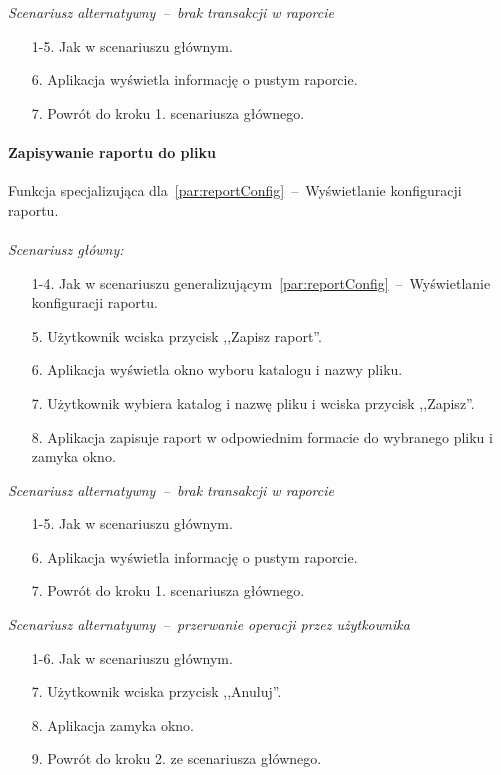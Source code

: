 \textit{Scenariusz alternatywny~--~brak transakcji w raporcie}
\begin{enumerate}
  \item[1-5.] Jak w scenariuszu głównym.
  \item[6.] Aplikacja wyświetla informację o pustym raporcie.
  \item[7.] Powrót do kroku 1. scenariusza głównego.
\end{enumerate}

\paragraph{Zapisywanie raportu do pliku\newline}
\label{par:reportExport}
\indent Funkcja specjalizująca dla~\ref{par:reportConfig}~--~Wyświetlanie konfiguracji raportu.\\\\
\textit{Scenariusz główny:}
\begin{enumerate}
  \item[1-4.] Jak w scenariuszu generalizującym~\ref{par:reportConfig}~--~Wyświetlanie konfiguracji raportu.
  \item[5.] Użytkownik wciska przycisk ,,Zapisz raport''.
  \item[6.] Aplikacja wyświetla okno wyboru katalogu i nazwy pliku.
  \item[7.] Użytkownik wybiera katalog i nazwę pliku i wciska przycisk ,,Zapisz''.
  \item[8.] Aplikacja zapisuje raport w odpowiednim formacie do wybranego pliku i zamyka okno.
\end{enumerate}

\textit{Scenariusz alternatywny~--~brak transakcji w raporcie}
\begin{enumerate}
  \item[1-5.] Jak w scenariuszu głównym.
  \item[6.] Aplikacja wyświetla informację o pustym raporcie.
  \item[7.] Powrót do kroku 1. scenariusza głównego.
\end{enumerate}

\textit{Scenariusz alternatywny~--~przerwanie operacji przez użytkownika}
\begin{enumerate}
  \item[1-6.] Jak w scenariuszu głównym.
  \item[7.] Użytkownik wciska przycisk ,,Anuluj''.
  \item[8.] Aplikacja zamyka okno.
  \item[9.] Powrót do kroku 2. ze scenariusza głównego.
\end{enumerate}

